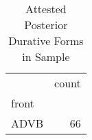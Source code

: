 \begin{table}[htbp!]
\centering
\caption{Attested Posterior Durative Forms in Sample}
\label{table:postdur_phtype}
\begin{tabular}{lr}
\toprule
{} &  count \\
front &        \\
\midrule
ADVB  &     66 \\
\bottomrule
\end{tabular}
\end{table}
